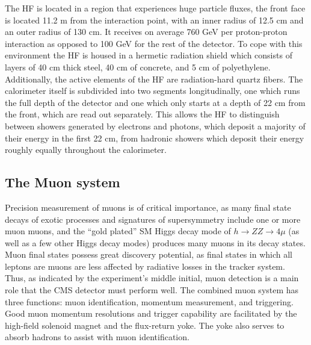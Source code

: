 The HF is located in a region that experiences huge particle fluxes, the front face is located 11.2 m from the interaction point, with an inner radius of 12.5 cm and an outer radius of 130 cm.  It receives on average 760 GeV per proton-proton interaction as opposed to 100 GeV for the rest of the detector.  To cope with this environment the HF is housed in a hermetic radiation shield which consists of layers of 40 cm thick steel, 40 cm of concrete, and 5 cm of polyethylene.  Additionally, the active elements of the HF are radiation-hard quartz fibers.  The calorimeter itself is subdivided into two segments longitudinally, one which runs the full depth of the detector and one which only starts at a depth of 22 cm from the front,  which are read out separately.  This allows the HF to distinguish between showers generated by electrons and photons, which deposit a majority of their energy in the first 22 cm, from hadronic showers which deposit their energy roughly equally throughout the calorimeter.



\subsection{The Muon system}
\label{muons}

Precision measurement of muons is of critical importance, as many final state decays of exotic processes and signatures of supersymmetry include one or more muon muons, and the ``gold plated'' SM Higgs decay mode of $h \rightarrow ZZ \rightarrow 4 \mu$ (as well as a few other Higgs decay modes) produces many muons in its decay states.  Muon final states possess great discovery potential, as final states in which all leptons are muons are less affected by radiative losses in the tracker system.  Thus, as indicated by the experiment's middle initial, muon detection is a main role that the CMS detector must perform well.  The combined muon system has three functions: muon identification, momentum measurement, and triggering.  Good muon momentum resolutions and trigger capability are facilitated by the high-field solenoid magnet and the flux-return yoke.  The yoke also serves to absorb hadrons to assist with muon identification.


